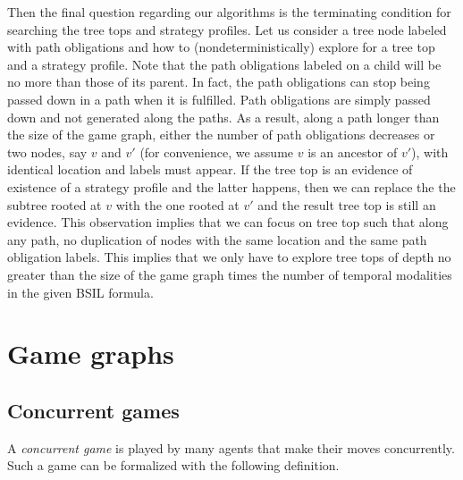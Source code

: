 \documentclass[11pt]{article}
\begin{document}
Then the final question regarding our algorithms is the terminating condition 
for searching the tree tops and strategy profiles. 
Let us consider a tree node labeled with path obligations and how to 
(nondeterministically) explore for a tree top and a strategy profile.  
Note that the path obligations labeled on a child will 
be no more than those of its parent.  
In fact, the path obligations can stop being passed down in a path when it is fulfilled. 
Path obligations are simply passed down and not generated along the paths.  
As a result, along a path longer than the size of the game graph, 
either the number of path obligations decreases or 
two nodes, say $v$ and $v'$ 
(for convenience, we assume $v$ is an ancestor of $v'$), 
with identical location and labels must appear. 
If the tree top is an evidence of existence of a strategy profile 
and the latter happens, 
then we can replace the the subtree rooted at $v$ with the one rooted at 
$v'$ and the result tree top is still an evidence.  
This observation implies that 
we can focus on tree top such that along any path, no duplication of 
nodes with the same location and the same path obligation labels.  
This implies that we only have to explore tree tops of depth no greater 
than the size of the game graph times the number of temporal modalities 
in the given BSIL formula.  






\section{Game graphs \label{sec.gg}} 


\subsection{Concurrent games \label{subsec.gg.c}} 

A {\em concurrent game} is played by many agents 
that make their moves concurrently.  
Such a game can be formalized \label{reply1.be.formalized} with the following definition.  
\end{document}
